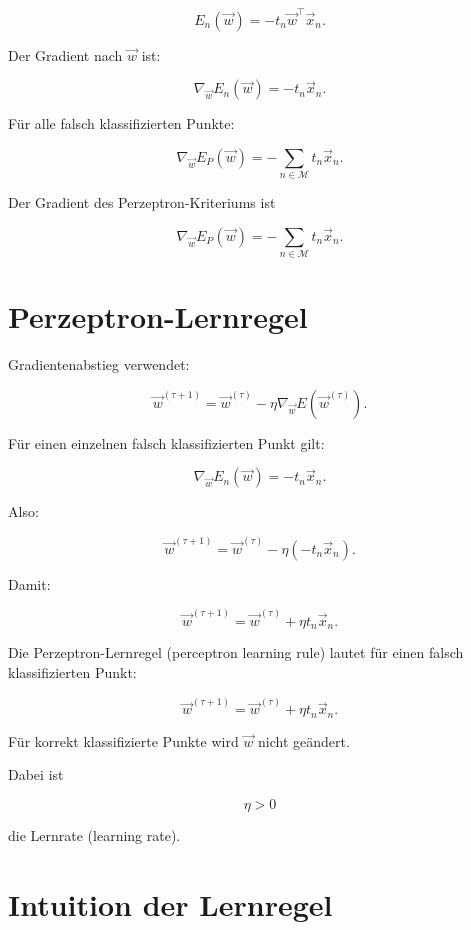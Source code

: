 \[
    E_n(\vec{w})
    =
    -t_n\vec{w}^{\top}\vec{x}_n.
\]

Der Gradient nach \(\vec{w}\) ist:

\[
    \nabla_{\vec{w}}E_n(\vec{w})
    =
    -t_n\vec{x}_n.
\]

Für alle falsch klassifizierten Punkte:

\[
    \nabla_{\vec{w}}E_P(\vec{w})
    =
    -\sum_{n\in\mathcal{M}}
    t_n\vec{x}_n.
\]

\begin{definitionbox}
Der Gradient des Perzeptron-Kriteriums ist

\[
    \nabla_{\vec{w}}E_P(\vec{w})
    =
    -\sum_{n\in\mathcal{M}}
    t_n\vec{x}_n.
\]
\end{definitionbox}

\section{Perzeptron-Lernregel}

Gradientenabstieg verwendet:

\[
    \vec{w}^{(\tau+1)}
    =
    \vec{w}^{(\tau)}
    -
    \eta
    \nabla_{\vec{w}}E(\vec{w}^{(\tau)}).
\]

Für einen einzelnen falsch klassifizierten Punkt gilt:

\[
    \nabla_{\vec{w}}E_n(\vec{w})
    =
    -t_n\vec{x}_n.
\]

Also:

\[
    \vec{w}^{(\tau+1)}
    =
    \vec{w}^{(\tau)}
    -
    \eta(-t_n\vec{x}_n).
\]

Damit:

\[
    \vec{w}^{(\tau+1)}
    =
    \vec{w}^{(\tau)}
    +
    \eta t_n\vec{x}_n.
\]

\begin{definitionbox}
Die Perzeptron-Lernregel (perceptron learning rule) lautet für einen falsch klassifizierten Punkt:

\[
    \vec{w}^{(\tau+1)}
    =
    \vec{w}^{(\tau)}
    +
    \eta t_n\vec{x}_n.
\]

Für korrekt klassifizierte Punkte wird \(\vec{w}\) nicht geändert.
\end{definitionbox}

Dabei ist

\[
    \eta>0
\]

die Lernrate (learning rate).

\section{Intuition der Lernregel}

